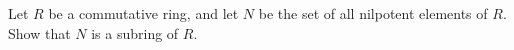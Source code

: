\documentclass{article}
\begin{document}
Let \(R\) be a commutative ring, and let \(N\) be the set of all nilpotent elements of \(R\). Show that \(N\) is a subring of \(R\).
\end{document}
